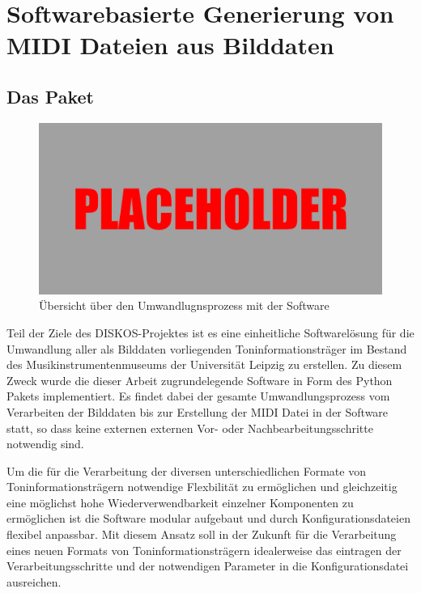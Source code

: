 \FloatBarrier

\section{Softwarebasierte Generierung von MIDI Dateien aus Bilddaten}

\subsection{Das  Paket}

\begin{figure}[t]
    \centering
    \includegraphics[width=\textwidth]{graphics/placeholder.png}
    \caption{Übersicht über den Umwandlugnsprozess mit der  Software}
    \label{softwareworkflow}
\end{figure}

Teil der Ziele des DISKOS-Projektes ist es eine einheitliche Softwarelösung für die Umwandlung aller als Bilddaten vorliegenden Toninformationsträger im Bestand des Musikinstrumentenmuseums der Universität Leipzig zu erstellen.
Zu diesem Zweck wurde die dieser Arbeit zugrundelegende Software in Form des  Python \parencite[]{van1995python} Pakets implementiert.
Es findet dabei der gesamte Umwandlungsprozess vom Verarbeiten der Bilddaten bis zur Erstellung der MIDI Datei in der Software statt, so dass keine externen externen Vor- oder Nachbearbeitungsschritte notwendig sind.

Um die für die Verarbeitung der diversen unterschiedlichen Formate von Toninformationsträgern notwendige Flexbilität zu ermöglichen und gleichzeitig eine möglichst hohe Wiederverwendbarkeit einzelner Komponenten zu ermöglichen ist die Software modular aufgebaut und durch Konfigurationsdateien flexibel anpassbar.
Mit diesem Ansatz soll in der Zukunft für die Verarbeitung eines neuen Formats von Toninformationsträgern idealerweise das eintragen der Verarbeitungsschritte und der notwendigen Parameter in die Konfigurationsdatei ausreichen.

